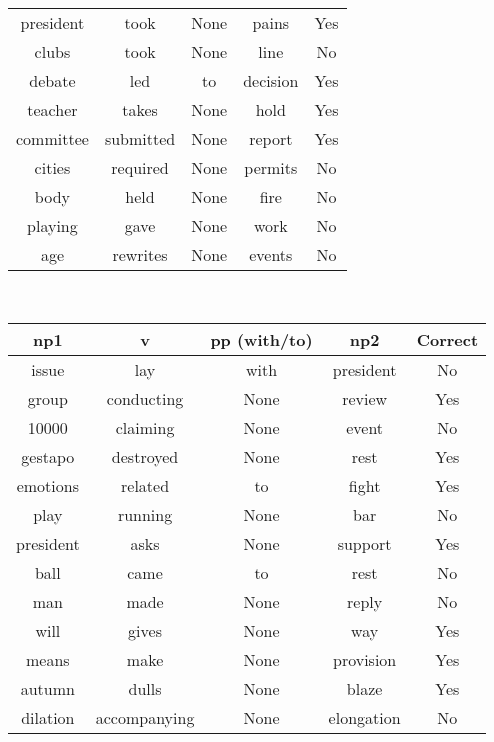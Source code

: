\documentclass[11pt]{article}
\begin{document}
\begin{tabular}{c c c c c}
president & took & None & pains & Yes\\
clubs & took & None & line & No\\
debate & led & to & decision & Yes\\
teacher & takes & None & hold & Yes\\
committee & submitted & None & report & Yes\\
cities & required & None & permits & No\\
body & held & None & fire & No\\
playing & gave & None & work & No\\
age & rewrites & None & events & No\\
\end{tabular} \\

\begin{tabular}{c c c c c}
np1 & v & pp (with/to) & np2  & Correct\\ \hline
issue & lay & with & president & No\\
group & conducting & None & review & Yes\\
10000 & claiming & None & event & No\\
gestapo & destroyed & None & rest & Yes\\
emotions & related & to & fight & Yes\\
play & running & None & bar & No\\
president & asks & None & support & Yes\\
ball & came & to & rest & No\\
man & made & None & reply & No\\
will & gives & None & way & Yes\\
means & make & None & provision & Yes\\
autumn & dulls & None & blaze & Yes\\
dilation & accompanying & None & elongation & No
\end{tabular} \\ \\ \\
\end{document}
